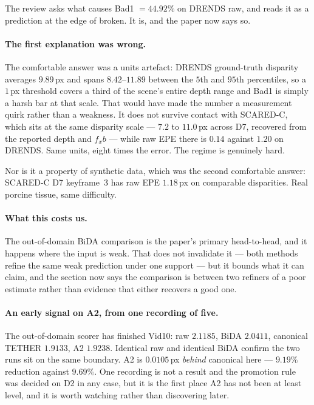 \documentclass[11pt,a4paper]{article}
\begin{document}
The review asks what causes Bad1 $=44.92\%$ on DRENDS raw, and reads it as a
prediction at the edge of broken. It is, and the paper now says so.

\paragraph{The first explanation was wrong.} The comfortable answer was a units
artefact: DRENDS ground-truth disparity averages $9.89$\,px and spans
$8.42$--$11.89$ between the $5$th and $95$th percentiles, so a $1$\,px threshold
covers a third of the scene's entire depth range and Bad1 is simply a harsh bar
at that scale. That would have made the number a measurement quirk rather than a
weakness. It does not survive contact with SCARED-C, which sits at the same
disparity scale --- $7.2$ to $11.0$\,px across D7, recovered from the reported
depth and $f_x b$ --- while raw EPE there is $0.14$ against $1.20$ on DRENDS.
Same units, eight times the error. The regime is genuinely hard.

Nor is it a property of synthetic data, which was the second comfortable answer:
SCARED-C D7 keyframe~$3$ has raw EPE $1.18$\,px on comparable disparities. Real
porcine tissue, same difficulty.

\paragraph{What this costs us.} The out-of-domain BiDA comparison is the paper's
primary head-to-head, and it happens where the input is weak. That does not
invalidate it --- both methods refine the same weak prediction under one support
--- but it bounds what it can claim, and the section now says the comparison is
between two refiners of a poor estimate rather than evidence that either
recovers a good one.

\paragraph{An early signal on A2, from one recording of five.} The out-of-domain
scorer has finished Vid10: raw $2.1185$, BiDA $2.0411$, canonical TETHER
$1.9133$, A2 $1.9238$. Identical raw and identical BiDA confirm the two runs sit
on the same boundary. A2 is $0.0105$\,px \emph{behind} canonical here --- $9.19\%$
reduction against $9.69\%$. One recording is not a result and the promotion rule
was decided on D2 in any case, but it is the first place A2 has not been at least
level, and it is worth watching rather than discovering later.
\end{document}
